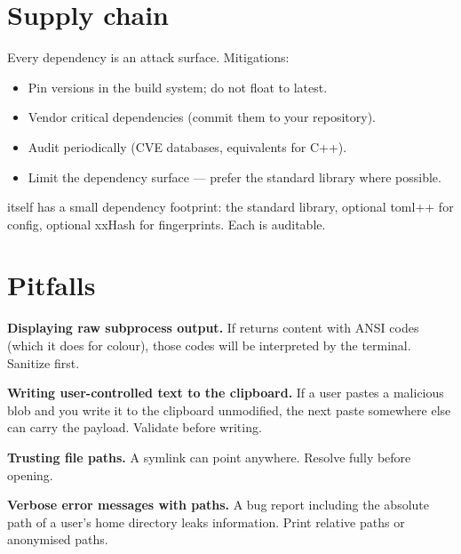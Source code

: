 \section{Supply chain}

Every dependency is an attack surface. Mitigations:

\begin{itemize}[leftmargin=*]
  \item Pin versions in the build system; do not float to
    latest.
  \item Vendor critical dependencies (commit them to your
    repository).
  \item Audit periodically (CVE databases, 
    equivalents for C++).
  \item Limit the dependency surface --- prefer the standard
    library where possible.
\end{itemize}

\maya{} itself has a small dependency footprint: the standard
library, optional toml++ for config, optional xxHash for
fingerprints. Each is auditable.

\section{Pitfalls}

\begin{warning}
\textbf{Displaying raw subprocess output.} If 
returns content with ANSI codes (which it does for colour),
those codes will be interpreted by the terminal. Sanitize
first.
\end{warning}

\begin{warning}
\textbf{Writing user-controlled text to the clipboard.} If a
user pastes a malicious blob and you write it to the clipboard
unmodified, the next paste somewhere else can carry the
payload. Validate before writing.
\end{warning}

\begin{warning}
\textbf{Trusting file paths.} A symlink can point anywhere.
Resolve fully before opening.
\end{warning}

\begin{warning}
\textbf{Verbose error messages with paths.} A bug report
including the absolute path of a user's home directory leaks
information. Print relative paths or anonymised paths.
\end{warning}

